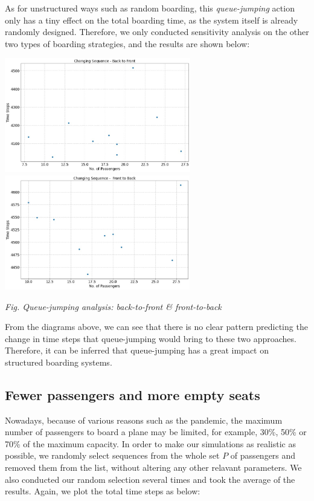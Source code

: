 \documentclass{article}
\theoremstyle{definition}
\theoremstyle{remark}
\numberwithin{equation}{section}
\begin{document}
	As for unstructured ways such as random boarding, this \textit{queue-jumping} action only has a tiny effect on the total boarding time, as the system itself is already randomly designed. Therefore, we only conducted sensitivity analysis on the other two types of boarding strategies, and the results are shown below:
	\begin{center}
		\includegraphics[height = 5cm]{changesq btf.jpg}
		\includegraphics[height = 5cm]{changesq ftb.jpg}

		\small\textit{Fig. Queue-jumping analysis: back-to-front \& front-to-back}
	\end{center}

	From the diagrams above, we can see that there is no clear pattern predicting the change in time steps that queue-jumping would bring to these two approaches. Therefore, it can be inferred that queue-jumping has a great impact on structured boarding systems.


	\subsection{Fewer passengers and more empty seats}
	Nowadays, because of various reasons such as the pandemic, the maximum number of passengers to board a plane may be limited, for example, 30\%, 50\% or 70\% of the maximum capacity. In order to make our simulations as realistic as possible, we randomly select sequences from the whole set \(P\) of passengers and removed them from the list, without altering any other relavant parameters. We also conducted our random selection several times and took the average of the results. Again, we plot the total time steps as below:
\end{document}
